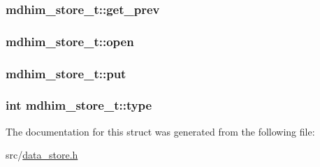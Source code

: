 \hypertarget{structmdhim__store__t_a43c5445119b911e3da419f26c5aae232}{
\subsubsection[{get\-\_\-prev}]{ mdhim\-\_\-store\-\_\-t\-::get\-\_\-prev}}\label{d1/dab/structmdhim__store__t_a43c5445119b911e3da419f26c5aae232}
\hypertarget{structmdhim__store__t_a8d77b86eb31d677f36b46f653865ea1d}{
\subsubsection[{open}]{ mdhim\-\_\-store\-\_\-t\-::open}}\label{d1/dab/structmdhim__store__t_a8d77b86eb31d677f36b46f653865ea1d}
\hypertarget{structmdhim__store__t_a5a33c9ea5897fdf71a54573ea49fef18}{
\subsubsection[{put}]{ mdhim\-\_\-store\-\_\-t\-::put}}\label{d1/dab/structmdhim__store__t_a5a33c9ea5897fdf71a54573ea49fef18}
\hypertarget{structmdhim__store__t_a00f8694bd01cc8cfda7479b7384e083b}{
\subsubsection[{type}]{\setlength{\rightskip}{0pt plus 5cm}int mdhim\-\_\-store\-\_\-t\-::type}}\label{d1/dab/structmdhim__store__t_a00f8694bd01cc8cfda7479b7384e083b}


The documentation for this struct was generated from the following file\-:\begin{DoxyCompactItemize}
\item 
src/\hyperlink{data__store_8h}{data\-\_\-store.\-h}\end{DoxyCompactItemize}
